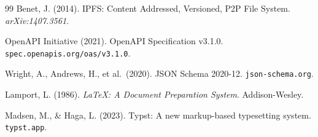 \documentclass[11pt]{rrxiv}
\begin{document}
\begin{thebibliography}{99}
Benet, J. (2014). IPFS: Content Addressed, Versioned, P2P File System. \emph{arXiv:1407.3561}.

OpenAPI Initiative (2021). OpenAPI Specification v3.1.0. \texttt{spec.openapis.org/oas/v3.1.0}.

Wright, A., Andrews, H., et al.\ (2020). JSON Schema 2020-12. \texttt{json-schema.org}.

Lamport, L. (1986). \emph{LaTeX: A Document Preparation System}. Addison-Wesley.

Madsen, M., \& Haga, L. (2023). Typst: A new markup-based typesetting system. \texttt{typst.app}.

\end{thebibliography}
\end{document}
